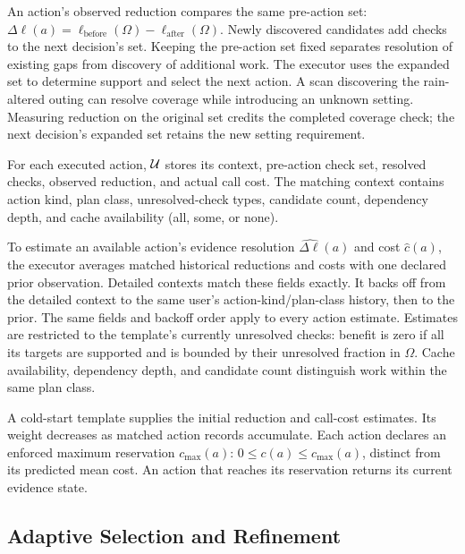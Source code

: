 An action's observed reduction compares the same pre-action set:
$\Delta\ell(a)=\ell_{\mathrm{before}}(\Omega)-
\ell_{\mathrm{after}}(\Omega)$.
Newly discovered candidates add checks to the next decision's set.
Keeping the pre-action set fixed separates resolution of existing gaps
from discovery of additional work. The executor uses the expanded set
to determine support and select the next action.
A scan discovering the rain-altered outing can resolve coverage while
introducing an unknown setting. Measuring reduction on the original set
credits the completed coverage check; the next decision's expanded set
retains the new setting requirement.

For each executed action, $\mathcal{U}$ stores its context, pre-action check set,
resolved checks, observed reduction, and actual call cost. The matching context contains action
kind, plan class, unresolved-check types, candidate count, dependency
depth, and cache availability (all, some, or none).

To estimate an available action's
evidence resolution $\widehat{\Delta\ell}(a)$ and cost $\widehat c(a)$,
the executor averages matched historical reductions and costs with one
declared prior observation. Detailed contexts match these fields exactly.
It backs off from the detailed context
to the same user's action-kind/plan-class history, then to the prior.
The same fields and backoff order apply to every action estimate.
Estimates are restricted to the template's currently unresolved checks:
benefit is zero if all its targets are supported and is bounded by their
unresolved fraction in $\Omega$. Cache availability, dependency depth,
and candidate count distinguish work within the same plan class.

A cold-start template supplies the initial reduction and call-cost
estimates. Its weight decreases as matched action records accumulate.
Each action declares an enforced maximum reservation $c_{\max}(a)$:
$0\leq c(a)\leq c_{\max}(a)$, distinct from its predicted mean cost.
An action that reaches its reservation returns its current evidence state.

\subsection{Adaptive Selection and Refinement}
\label{subsec:new-value}

